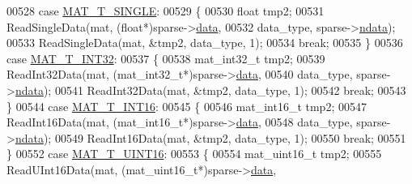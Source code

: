 \begin{DoxyCode}
{{00528                             \textcolor{keywordflow}{case} \hyperlink{group___m_a_t_ggacf7b3b879282b7ab3a51190e49bf3453a3a3657d40e9212c923d9b9d03531b64c}{MAT\_T\_SINGLE}:
00529                             \{
00530                                 \textcolor{keywordtype}{float} tmp2;
00531                                 ReadSingleData(mat, (\textcolor{keywordtype}{float}*)sparse->\hyperlink{group___m_a_t_ae2c648cb9eac4ce47f26cddb44246152}{data},
00532                                     data\_type, sparse->\hyperlink{group___m_a_t_a1beb8a8c58a808207cbea650563a9b63}{ndata});
00533                                 ReadSingleData(mat, &tmp2, data\_type, 1);
00534                                 \textcolor{keywordflow}{break};
00535                             \}
00536                             \textcolor{keywordflow}{case} \hyperlink{group___m_a_t_ggacf7b3b879282b7ab3a51190e49bf3453a83e06a68320726c6572bfbb9f3addb1d}{MAT\_T\_INT32}:
00537                             \{
00538                                 mat\_int32\_t tmp2;
00539                                 ReadInt32Data(mat, (mat\_int32\_t*)sparse->\hyperlink{group___m_a_t_ae2c648cb9eac4ce47f26cddb44246152}{data},
00540                                     data\_type, sparse->\hyperlink{group___m_a_t_a1beb8a8c58a808207cbea650563a9b63}{ndata});
00541                                 ReadInt32Data(mat, &tmp2, data\_type, 1);
00542                                 \textcolor{keywordflow}{break};
00543                             \}
00544                             \textcolor{keywordflow}{case} \hyperlink{group___m_a_t_ggacf7b3b879282b7ab3a51190e49bf3453a8c5b2e381946e95ea8d81ac216743302}{MAT\_T\_INT16}:
00545                             \{
00546                                 mat\_int16\_t tmp2;
00547                                 ReadInt16Data(mat, (mat\_int16\_t*)sparse->\hyperlink{group___m_a_t_ae2c648cb9eac4ce47f26cddb44246152}{data},
00548                                     data\_type, sparse->\hyperlink{group___m_a_t_a1beb8a8c58a808207cbea650563a9b63}{ndata});
00549                                 ReadInt16Data(mat, &tmp2, data\_type, 1);
00550                                 \textcolor{keywordflow}{break};
00551                             \}
00552                             \textcolor{keywordflow}{case} \hyperlink{group___m_a_t_ggacf7b3b879282b7ab3a51190e49bf3453a05bc7af7680aa68be95126ae0a4c2e31}{MAT\_T\_UINT16}:
00553                             \{
00554                                 mat\_uint16\_t tmp2;
00555                                 ReadUInt16Data(mat, (mat\_uint16\_t*)sparse->\hyperlink{group___m_a_t_ae2c648cb9eac4ce47f26cddb44246152}{data},
}}
\end{DoxyCode}
